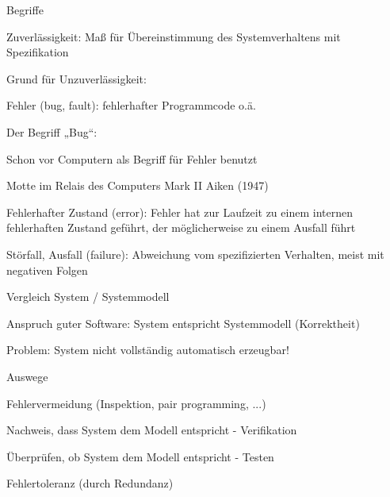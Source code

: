 \documentclass[a4paper]{article}
\begin{document}
\begin{multicols}{3}
  Begriffe
  \begin{itemize*}
    \item Zuverlässigkeit: Maß für Übereinstimmung des Systemverhaltens mit Spezifikation
    \item Grund für Unzuverlässigkeit:
          \begin{itemize*}
            \item Fehler (bug, fault): fehlerhafter Programmcode o.ä.
                  \begin{itemize*}
                    \item Der Begriff „Bug“:
                          \begin{itemize*}
                            \item Schon vor Computern als Begriff für Fehler benutzt
                            \item Motte im Relais des Computers Mark II Aiken (1947)
                          \end{itemize*}
                  \end{itemize*}
          \end{itemize*}
    \item Fehlerhafter Zustand (error): Fehler hat zur Laufzeit zu einem internen fehlerhaften Zustand geführt, der möglicherweise zu einem Ausfall führt
    \item Störfall, Ausfall (failure): Abweichung vom spezifizierten Verhalten, meist mit negativen Folgen
  \end{itemize*}

  Vergleich System / Systemmodell
  \begin{itemize*}
    \item Anspruch guter Software: System entspricht Systemmodell (Korrektheit)
    \item Problem: System nicht vollständig automatisch erzeugbar!
    \item Auswege
          \begin{itemize*}
            \item Fehlervermeidung (Inspektion, pair programming, ...)
            \item Nachweis, dass System dem Modell entspricht - Verifikation
            \item Überprüfen, ob System dem Modell entspricht - Testen
            \item Fehlertoleranz (durch Redundanz)
          \end{itemize*}
  \end{itemize*}


\end{multicols}
\end{document}
